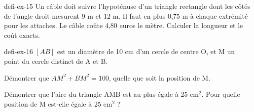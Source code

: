 \begin{blocEdition}{defi-ex-15}
Un câble doit suivre l’hypoténuse d’un triangle rectangle dont les côtés de l’angle droit mesurent 9 m et 12 m. Il faut en plus 0,75 m à chaque extrémité pour les attaches. Le câble coûte 4,80 euros le mètre. Calculer la longueur et le coût exacts.\label{fig-defi-15}
\par{}\par\par{}\par{}\par{}\par{}\par{}\par{}
\end{blocEdition}
\begin{blocEdition}{defi-ex-16}
$[AB]$ est un diamètre de 10 cm d’un cercle de centre O, et M un point du cercle distinct de A et B.\begin{questions}\item Démontrer que $AM^2+BM^2=100$, quelle que soit la position de M.\item Démontrer que l’aire du triangle AMB est au plus égale à 25 cm$^2$. Pour quelle position de M est-elle égale à 25 cm$^2$ ?\end{questions}\label{fig-defi-16}
\par{}\par\par{}\par{}\par{}\par{}\par{}\par{}
\end{blocEdition}
